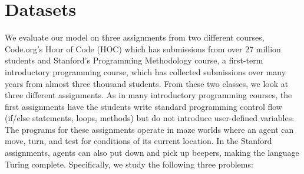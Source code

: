 

\section{Datasets}\label{sec:data}

\begin{table}[t]
  \centering
  \caption[Encoding dataset summary]{Dataset summary. Programs are considered identical if they have equal ASTs. Unique states are different configurations of the gridworld which occur in student programs.}
  \label{tab:datasummary}
\end{table}

We evaluate our model on three assignments from two different courses, Code.org's Hour of Code (HOC) which has submissions from over 27 million students and Stanford’s Programming Methodology course, a first-term introductory programming course, which has collected submissions over many years from almost three thousand students. From these two classes, we look at three different assignments. As in many introductory programming courses, the first assignments have the students write standard programming control flow (if/else statements, loops, methods) but do not introduce user-defined variables. The programs for these assignments operate in maze worlds where an agent can move, turn, and test for conditions of its current location. In the Stanford assignments, agents can also put down and pick up beepers, 
making the language Turing complete.  Specifically, we study
the following three problems:

